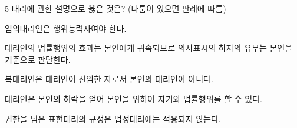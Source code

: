 \begin{question}{5}
대리에 관한 설명으로 옳은 것은? (다툼이 있으면 판례에 따름)
\begin{choices}
  \item 임의대리인은 행위능력자여야 한다.
  \item 대리인의 법률행위의 효과는 본인에게 귀속되므로 의사표시의 하자의 유무는 본인을 기준으로 판단한다.
  \item 복대리인은 대리인이 선임한 자로서 본인의 대리인이 아니다.
  \item 대리인은 본인의 허락을 얻어 본인을 위하여 자기와 법률행위를 할 수 있다.
  \item 권한을 넘은 표현대리의 규정은 법정대리에는 적용되지 않는다.
\end{choices}
\end{question}
